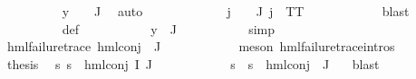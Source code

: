 \begin{isabellebody}
\ \ \ \ \ \ \ \ \isamarkupfalse%
\ {\isacartoucheopen}y\ {\isasymin}\ {\isasymPhi}\ {\isacharbackquote}{\kern0pt}\ J{\isacartoucheclose}\ \isamarkupfalse%
\ auto\isanewline
\ \ \ \ \ \ \isamarkupfalse%
\ {\isachardoublequoteopen}{\isasymPsi}\ {\isacharbackquote}{\kern0pt}\ {\isacharbraceleft}{\kern0pt}{\isacharbraceright}{\kern0pt}\ {\isacharequal}{\kern0pt}\ {\isacharbraceleft}{\kern0pt}{\isacharbraceright}{\kern0pt}{\isachardoublequoteclose}\ {\isachardoublequoteopen}{\isasymforall}j\ {\isasymin}\ {\isasymPsi}\ {\isacharbackquote}{\kern0pt}\ J{\isachardot}{\kern0pt}\ j\ {\isacharequal}{\kern0pt}\ TT{\isachardoublequoteclose}\ \isanewline
\ \ \ \ \ \ \ \ \ \isamarkupfalse%
\ blast\isanewline
\ \ \ \ \ \ \ \ \isamarkupfalse%
\ {\isasymPsi}{\isacharunderscore}{\kern0pt}def\ \isanewline
\ \ \ \ \ \ \ \ \isamarkupfalse%
\ {\isacartoucheopen}y\ {\isasymin}\ {\isasymPhi}{\isacharbackquote}{\kern0pt}J{\isacartoucheclose}\ \isanewline
\ \ \ \ \ \ \ \ \isamarkupfalse%
\ simp\isanewline
\ \ \ \ \ \ \isamarkupfalse%
\ {\isachardoublequoteopen}hml{\isacharunderscore}{\kern0pt}failure{\isacharunderscore}{\kern0pt}trace\ {\isacharparenleft}{\kern0pt}hml{\isacharunderscore}{\kern0pt}conj\ {\isacharbraceleft}{\kern0pt}{\isacharbraceright}{\kern0pt}\ J\ {\isasymPsi}{\isacharparenright}{\kern0pt}{\isachardoublequoteclose}\ \isanewline
\ \ \ \ \ \ \ \ \isamarkupfalse%
\ {\isacharparenleft}{\kern0pt}meson\ hml{\isacharunderscore}{\kern0pt}failure{\isacharunderscore}{\kern0pt}trace{\isachardot}{\kern0pt}intros{\isacharparenleft}{\kern0pt}{}{\isacharparenright}{\kern0pt}{\isacharparenright}{\kern0pt}\isanewline
\ \ \ \ \ \ \isamarkupfalse%
\ \isamarkupfalse%
\ {\isacharquery}{\kern0pt}thesis\ \isamarkupfalse%
\ {\isacartoucheopen}{\isasymforall}s{\isachardot}{\kern0pt}\ {\isasymnot}s\ {\isasymTurnstile}\ {\isacharparenleft}{\kern0pt}hml{\isacharunderscore}{\kern0pt}conj\ I\ J\ {\isasymPhi}{\isacharparenright}{\kern0pt}{\isacartoucheclose}\ \isanewline
\ \ \ \ \ \ \ \ \isamarkupfalse%
\ {\isacartoucheopen}{\isasymforall}s{\isachardot}{\kern0pt}\ {\isasymnot}\ s\ {\isasymTurnstile}\ hml{\isacharunderscore}{\kern0pt}conj\ {\isacharbraceleft}{\kern0pt}{\isacharbraceright}{\kern0pt}\ J\ {\isasymPsi}{\isacartoucheclose}\ \isamarkupfalse%
\ blast\isanewline
\ \ \ \ \isamarkupfalse%
\isanewline
\ \ \isamarkupfalse%

\end{isabellebody}
